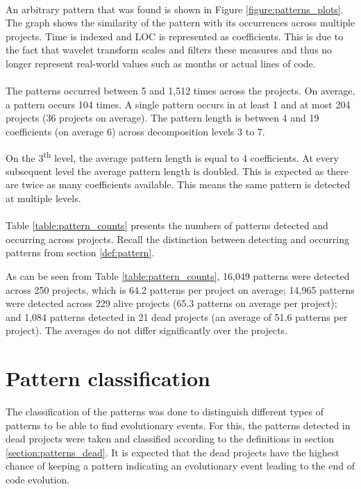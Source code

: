 \paragraph{}
An arbitrary pattern that was found is shown in Figure
\ref{figure:patterns_plots}. The graph shows the similarity of the pattern with
its occurrences across multiple projects. Time is indexed and LOC is
represented as coefficients. This is due to the fact that wavelet transform
scales and filters these measures and thus no longer represent real-world
values such as months or actual lines of code.



\paragraph{}
The patterns occurred between 5 and 1,512 times across the projects. On
average, a pattern occurs 104 times. A single pattern occurs in at least 1 and
at most 204 projects (36 projects on average). The pattern length is between 4
and 19 coefficients (on average 6) across decomposition levels 3 to 7.

On the 3\textsuperscript{th} level, the average pattern length is equal to 4
coefficients. At every subsequent level the average pattern length is doubled.
This is expected as there are twice as many coefficients available. This means
the same pattern is detected at multiple levels.

\paragraph{}
Table \ref{table:pattern_counts} presents the numbers of patterns
detected and occurring across projects. Recall the distinction between
detecting and occurring patterns from section \ref{def:pattern}.



\noindent
As can be seen from Table \ref{table:pattern_counts}, 16,049 patterns were
detected across 250 projects, which is 64.2 patterns per project on average;
14,965 patterns were detected across 229 alive projects (65.3 patterns on
average per project); and 1,084 patterns detected in 21 dead projects (an
average of 51.6 patterns per project). The averages do not differ significantly
over the projects.



\section{Pattern classification}
The classification of the patterns was done to distinguish different types of
patterns to be able to find evolutionary events. For this, the patterns
detected in dead projects were taken and classified according to
the definitions in section \ref{section:patterns_dead}. It is expected that
the dead projects have the highest chance of keeping a pattern indicating
an evolutionary event leading to the end of code evolution.

